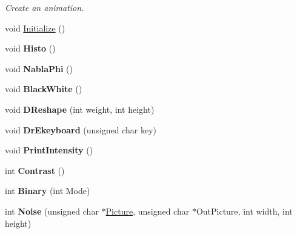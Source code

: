 \begin{DoxyCompactItemize}
\begin{DoxyCompactList}\small\item\em Create an animation. \end{DoxyCompactList}\item 
void \hyperlink{classDrEffect_a98b1050f09da390896f964fb7a892391}{Initialize} ()
\item 
void {\bfseries Histo} ()\hypertarget{classDrEffect_a8121ce6dcaabd895864fcb398d61830a}{}\label{classDrEffect_a8121ce6dcaabd895864fcb398d61830a}

\item 
void {\bfseries Nabla\+Phi} ()\hypertarget{classDrEffect_a4ac7178d0dc54a6e3ef5baf06f7c0f6a}{}\label{classDrEffect_a4ac7178d0dc54a6e3ef5baf06f7c0f6a}

\item 
void {\bfseries Black\+White} ()\hypertarget{classDrEffect_af982d1688f2311db74fc3f30bcdb793c}{}\label{classDrEffect_af982d1688f2311db74fc3f30bcdb793c}

\item 
void {\bfseries D\+Reshape} (int weight, int height)\hypertarget{classDrEffect_a79efe43daa44b6da6e1c3179c97625ed}{}\label{classDrEffect_a79efe43daa44b6da6e1c3179c97625ed}

\item 
void {\bfseries Dr\+Ekeyboard} (unsigned char key)\hypertarget{classDrEffect_ac9184736d5fec94273a1784787a387c9}{}\label{classDrEffect_ac9184736d5fec94273a1784787a387c9}

\item 
void {\bfseries Print\+Intensity} ()\hypertarget{classDrEffect_a276658b556a1c7496e893a4888ffd0a0}{}\label{classDrEffect_a276658b556a1c7496e893a4888ffd0a0}

\item 
int {\bfseries Contrast} ()\hypertarget{classDrEffect_a87cab2148c827f9de25acf21b7b75e69}{}\label{classDrEffect_a87cab2148c827f9de25acf21b7b75e69}

\item 
int {\bfseries Binary} (int Mode)\hypertarget{classDrEffect_ac569c02507323cdda29fb1e184932f26}{}\label{classDrEffect_ac569c02507323cdda29fb1e184932f26}

\item 
int {\bfseries Noise} (unsigned char $\ast$\hyperlink{classDraw_a45ed15a0527d5ba75107645dc8467078}{Picture}, unsigned char $\ast$Out\+Picture, int width, int height)\hypertarget{classDrEffect_aaf6edb6412f345f308004d4bbdfe6f21}{}\label{classDrEffect_aaf6edb6412f345f308004d4bbdfe6f21}


\end{DoxyCompactItemize}
